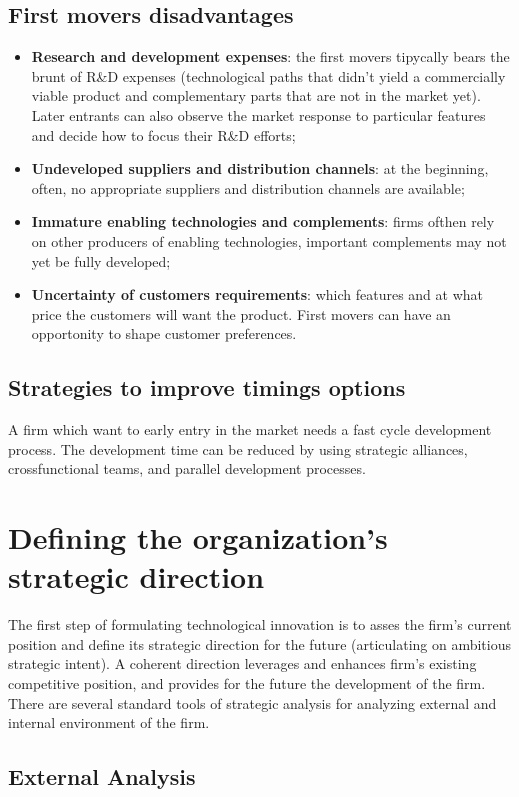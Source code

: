 \documentclass[12pt]{article}
\begin{document}
\subsection{First movers disadvantages}
\begin{itemize}
    \item \textbf{Research and development expenses}: the first movers tipycally bears the brunt of R\&D expenses (technological paths that didn't yield a commercially viable product and complementary
    parts that are not in the market yet).
    Later entrants can also observe the market response to particular features and decide how to focus their R\&D efforts;
    \item \textbf{Undeveloped suppliers and distribution channels}: at the beginning, often, no appropriate suppliers and distribution channels are available;
    \item \textbf{Immature enabling technologies and complements}: firms ofthen rely on other producers of enabling technologies, important complements may not yet be fully developed;
    \item \textbf{Uncertainty of customers requirements}: which features and at what price the customers will want the product.
    First movers can have an opportonity to shape customer preferences.
\end{itemize}
\subsection{Strategies to improve timings options}
A firm which want to early entry in the market needs a fast cycle development process.
The development time can be reduced by using strategic alliances, crossfunctional teams, and parallel development processes.
\section{Defining the organization's strategic direction}
The first step of formulating technological innovation is to asses the firm's current position and define its strategic direction for the future (articulating on ambitious strategic intent).
A coherent direction leverages and enhances firm's existing competitive position, and provides for the future the development of the firm.
There are several standard tools of strategic analysis for analyzing external and internal environment of the firm.
\subsection{External Analysis}
\end{document}
